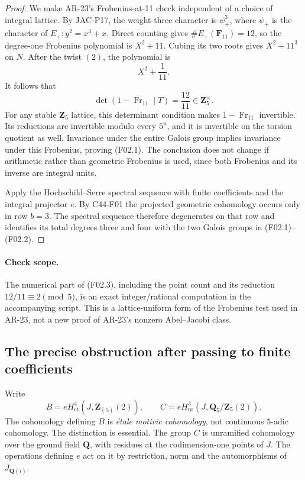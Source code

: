 \documentclass[11pt]{article}
\theoremstyle{remark}\newtheorem{remark}[theorem]{Remark}
\begin{document}
\begin{proof}
We make AR-23's Frobenius-at-11 check independent of a choice of
integral lattice.  By JAC-P17, the weight-three character is
$\psi_+^3$, where $\psi_+$ is the character of
$E_+:y^2=x^3+x$.  Direct counting gives
$\#E_+(\mathbf F_{11})=12$, so the degree-one Frobenius
polynomial is $X^2+11$.  Cubing its two roots gives
$X^2+11^3$ on $N$.  After the twist $(2)$, the polynomial is
\[
                 X^2+\frac1{11}.
\]
It follows that
\[
       \det(1-\operatorname{Fr}_{11}\mid T)
              =\frac{12}{11}\in\mathbf Z_5^\times.
 \tag{F02.3}
\]
For any stable $\mathbf Z_5$ lattice, this determinant condition
makes $1-\operatorname{Fr}_{11}$ invertible.  Its reductions are
invertible modulo every $5^n$, and it is invertible on the torsion
quotient as well.  Invariance under the entire Galois group implies
invariance under this Frobenius, proving (F02.1).  The conclusion
does not change if arithmetic rather than geometric Frobenius is
used, since both Frobenius and its inverse are integral units.

Apply the Hochschild--Serre spectral sequence with finite
coefficients and the integral projector $e$.  By C44-F01 the
projected geometric cohomology occurs only in row $b=3$.
The spectral sequence therefore degenerates on that row and
identifies its total degrees three and four with the two Galois
groups in (F02.1)--(F02.2).
\end{proof}

\paragraph{Check scope.}
The numerical part of (F02.3), including the point count and its
reduction $12/11\equiv2\pmod5$, is an exact integer/rational
computation in the accompanying script.  This is a lattice-uniform
form of the Frobenius test used in AR-23, not a new proof of
AR-23's nonzero Abel--Jacobi class.

\subsection{The precise obstruction after passing to finite coefficients}

Write
\[
 B=eH^4_{\mathrm{et}}(J,\mathbf Z_{(5)}(2)),
 \qquad
 C=eH^3_{\mathrm{nr}}(J,\mathbf Q_5/\mathbf Z_5(2)).
 \tag{F03.1}
\]
The cohomology defining $B$ is \emph{\'etale motivic cohomology},
not continuous $5$-adic cohomology.  The distinction is essential.
The group $C$ is unramified cohomology over the ground field
$\mathbf Q$, with residues at the codimension-one points of $J$.
The operations defining $e$ act on it by restriction, norm and
the automorphisms of $J_{\mathbf Q(i)}$.
\end{document}
